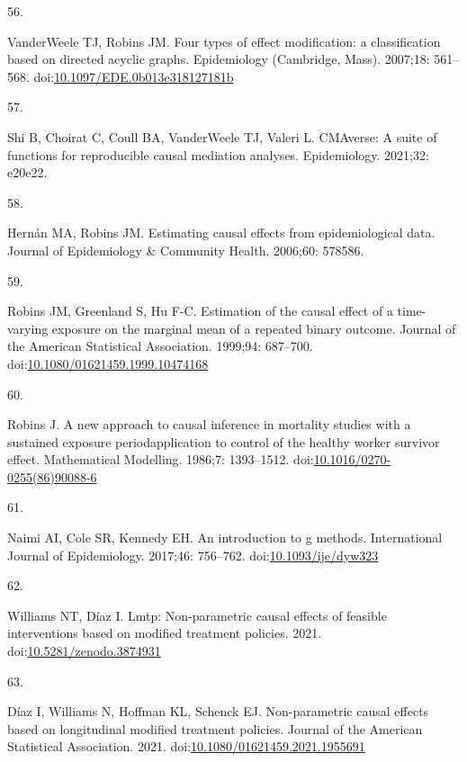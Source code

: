 \documentclass[
  singlecolumn]{article}
\newlength{\cslhangindent}
\newlength{\csllabelwidth}
\newlength{\cslentryspacingunit} %
\newenvironment{CSLReferences}[2] %
 {%
  \setlength{\parindent}{0pt}
  \ifodd #1
  \let\oldpar\par
  \def\par{\hangindent=\cslhangindent\oldpar}
  \fi
  \setlength{\parskip}{#2\cslentryspacingunit}
 }%
 {}
\newcommand{\CSLLeftMargin}[1]{\parbox[t]{\csllabelwidth}{#1}}
\newcommand{\CSLRightInline}[1]{\parbox[t]{\linewidth - \csllabelwidth}{#1}\break}
\begin{document}
\begin{CSLReferences}{0}{0}
\leavevmode{}%
\CSLLeftMargin{56. }%
\CSLRightInline{VanderWeele TJ, Robins JM. Four types of effect
modification: a classification based on directed acyclic graphs.
Epidemiology (Cambridge, Mass). 2007;18: 561--568.
doi:\href{https://doi.org/10.1097/EDE.0b013e318127181b}{10.1097/EDE.0b013e318127181b}}

\leavevmode{}%
\CSLLeftMargin{57. }%
\CSLRightInline{Shi B, Choirat C, Coull BA, VanderWeele TJ, Valeri L.
CMAverse: A suite of functions for reproducible causal mediation
analyses. Epidemiology. 2021;32: e20e22. }

\leavevmode{}%
\CSLLeftMargin{58. }%
\CSLRightInline{Hernán MA, Robins JM. Estimating causal effects from
epidemiological data. Journal of Epidemiology \& Community Health.
2006;60: 578586. }

\leavevmode{}%
\CSLLeftMargin{59. }%
\CSLRightInline{Robins JM, Greenland S, Hu F-C. Estimation of the causal
effect of a time-varying exposure on the marginal mean of a repeated
binary outcome. Journal of the American Statistical Association.
1999;94: 687--700.
doi:\href{https://doi.org/10.1080/01621459.1999.10474168}{10.1080/01621459.1999.10474168}}

\leavevmode{}%
\CSLLeftMargin{60. }%
\CSLRightInline{Robins J. A new approach to causal inference in
mortality studies with a sustained exposure
period{\textemdash}application to control of the healthy worker survivor
effect. Mathematical Modelling. 1986;7: 1393--1512.
doi:\href{https://doi.org/10.1016/0270-0255(86)90088-6}{10.1016/0270-0255(86)90088-6}}

\leavevmode{}%
\CSLLeftMargin{61. }%
\CSLRightInline{Naimi AI, Cole SR, Kennedy EH. An introduction to g
methods. International Journal of Epidemiology. 2017;46: 756--762.
doi:\href{https://doi.org/10.1093/ije/dyw323}{10.1093/ije/dyw323}}

\leavevmode{}%
\CSLLeftMargin{62. }%
\CSLRightInline{Williams NT, Díaz I. Lmtp: Non-parametric causal effects
of feasible interventions based on modified treatment policies. 2021.
doi:\href{https://doi.org/10.5281/zenodo.3874931}{10.5281/zenodo.3874931}}

\leavevmode{}%
\CSLLeftMargin{63. }%
\CSLRightInline{Díaz I, Williams N, Hoffman KL, Schenck EJ.
Non-parametric causal effects based on longitudinal modified treatment
policies. Journal of the American Statistical Association. 2021.
doi:\href{https://doi.org/10.1080/01621459.2021.1955691}{10.1080/01621459.2021.1955691}}


\end{CSLReferences}
\end{document}
